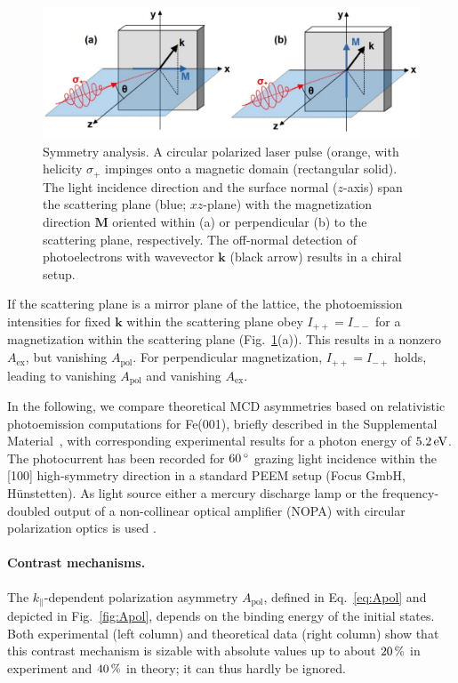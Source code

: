 \documentclass[prl,twocolumn,floatfix,superscriptaddress]{revtex4-2}
\renewcommand{\vec}[1]{\boldsymbol{#1}}
\begin{document}
\begin{figure}
    \centering
    \includegraphics[width = \columnwidth]{symmetry}
    \caption{Symmetry analysis. A circular polarized laser pulse (orange, with helicity $\sigma_{+}$ impinges onto a magnetic domain (rectangular solid). The light incidence direction and the surface normal ($z$-axis) span the scattering plane (blue; $xz$-plane) with the magnetization direction $\vec{M}$ oriented within (a) or perpendicular (b) to the scattering plane, respectively. The off-normal detection of photoelectrons with wavevector $\vec{k}$ (black arrow) results in a chiral setup.}
    \label{fig:symmetry}
\end{figure}

If the scattering plane is a mirror plane of the lattice, the photoemission intensities for fixed $\vec{k}$ within the scattering plane obey $I_{+ +} = I_{- -}$ for a magnetization within the scattering plane (Fig.~\ref{fig:symmetry}(a)). This results in a nonzero $A_{\mathrm{ex}}$, but vanishing $A_{\mathrm{pol}}$. For perpendicular magnetization, $I_{+ +} = I_{- +}$ holds, leading to vanishing $A_{\mathrm{pol}}$ and vanishing $A_{\mathrm{ex}}$.

In the following, we compare theoretical MCD asymmetries based on relativistic photoemission computations for Fe(001), briefly described in the Supplemental Material~\cite{Supplement}, with corresponding experimental results for a photon energy of $\unit[5.2]{eV}$. The photocurrent has been recorded for $\unit[60]{^{\circ}}$ grazing light incidence within the [100] high-symmetry direction in a standard PEEM setup (Focus GmbH, Hünstetten). As light source either a mercury discharge lamp or the frequency-doubled output of a non-collinear optical amplifier (NOPA) with circular polarization optics is used \cite{duncker2012,gillmeister2020, paleschke2021}. 

\paragraph{Contrast mechanisms.} 
The $k_{\parallel}$-dependent polarization asymmetry $A_{\mathrm{pol}}$, defined in Eq.~\eqref{eq:Apol} and depicted in Fig.~\ref{fig:Apol}, depends on the binding energy of the initial states. Both experimental (left column) and theoretical data (right column) show that this contrast mechanism is sizable with absolute values up to about $\unit[20]{\%}$ in experiment and $\unit[40]{\%}$ in theory; it can thus hardly be ignored. 
\end{document}
